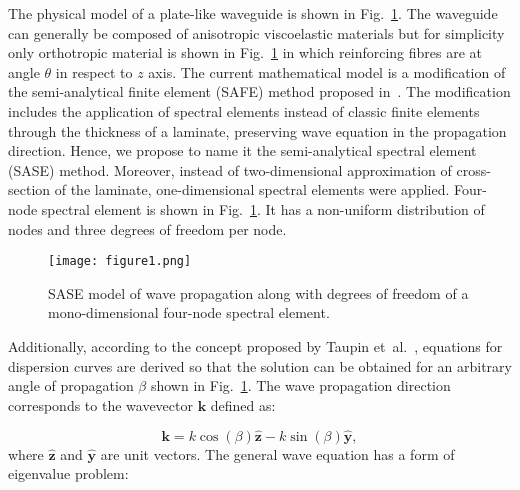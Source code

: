 \documentclass[preprint,12pt]{elsarticle}
\newcommand{\vect}[1]{\mathbf{#1}} %
\begin{document}
	The physical model of a plate-like waveguide is shown in 
	Fig.~\ref{fig:layered_composite_SASE}.  The waveguide can generally be composed 
	of anisotropic viscoelastic materials but for simplicity only orthotropic material is 
	shown in Fig.~\ref{fig:layered_composite_SASE} in which reinforcing fibres are at 
	angle \(\theta\) in respect to \(z\) axis. The current mathematical model is a 
	modification of the semi-analytical finite element (SAFE) method proposed 
	in~\cite{Bartoli2006}. The modification includes the application of spectral elements 
	instead of classic finite elements through the thickness of a laminate, preserving 
	wave equation in the propagation direction. Hence, we propose to name it the 
	semi-analytical spectral element (SASE) method. Moreover, instead of 
	two-dimensional approximation of cross-section of the laminate, one-dimensional 
	spectral elements were applied. Four-node spectral element is shown in 
	Fig.~\ref{fig:layered_composite_SASE}. It has a non-uniform distribution of nodes 
	and three degrees of freedom per node.
	
		\begin{figure} [h!]
		\centering
		\texttt{[image: figure1.png]}
		\caption{SASE model of wave propagation along with degrees of freedom of a mono-dimensional four-node spectral element.}
		\label{fig:layered_composite_SASE}
	\end{figure}
	
	Additionally, according to the concept proposed by Taupin et~al.~\cite{Taupin2011}, 
	equations for dispersion curves are derived so that the solution can be obtained for 
	an arbitrary angle of propagation \(\beta\) shown in 
	Fig.~\ref{fig:layered_composite_SASE}. The wave propagation direction corresponds 
	to the wavevector \(\vect{k}\) defined as:
	
	\begin{equation}
	  \vect{k} = k \cos (\beta)\hat{ \vect{z}} - k \sin (\beta) \hat{\vect{y}},
		\label{eq:wavevector}
	\end{equation}
	where \(\hat{ \vect{z}}\) and \(\hat{\vect{y}}\) are unit vectors. The general wave 
	equation has a form of eigenvalue problem:
\end{document}
